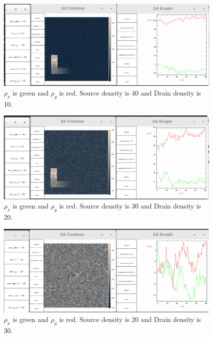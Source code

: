 \documentclass{article}
\begin{document}
\begin{figure}[H]
\centering
\includegraphics[scale=0.25]{source_40_drain_10.png}
\caption{\label{fig} $\rho_x$ is green and $\rho_y$ is red. Source density is 40 and Drain density is 10.}
\end{figure}

\begin{figure}[H]
\centering
\includegraphics[scale=0.25]{source_30_drain_20.png}
\caption{\label{fig} $\rho_x$ is green and $\rho_y$ is red. Source density is 30 and Drain density is 20.}
\end{figure}

\begin{figure}[H]
\centering
\includegraphics[scale=0.25]{source_20_drain_30.png}
\caption{\label{fig} $\rho_x$ is green and $\rho_y$ is red. Source density is 20 and Drain density is 30.}
\end{figure}
\end{document}
